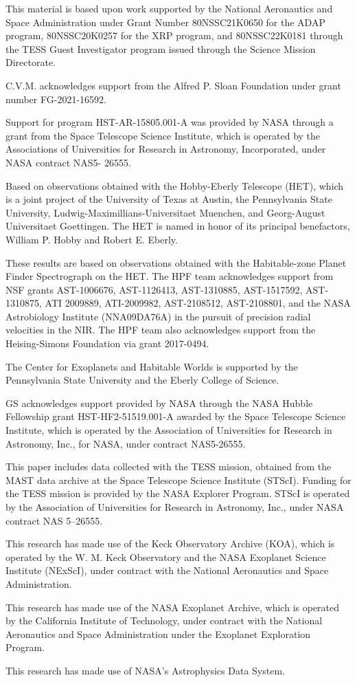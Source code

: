 \documentclass[linenumbers, twocolumn, trackchanges]{aastex631}
\begin{document}
\begin{acknowledgements}

  This material is based upon work supported by the National Aeronautics and Space Administration under Grant Number 80NSSC21K0650 for the ADAP program, 80NSSC20K0257 for the XRP program, and 80NSSC22K0181 through the TESS Guest Investigator program issued through the Science Mission Directorate.

  C.V.M. acknowledges support from the Alfred P. Sloan Foundation under grant number FG-2021-16592.

  Support for program HST-AR-15805.001-A was provided by NASA through a grant from the Space Telescope Science Institute, which is operated by the Associations of Universities for Research in Astronomy, Incorporated, under NASA contract NAS5- 26555.

  Based on observations obtained with the Hobby-Eberly Telescope (HET), which is a joint project of the University of Texas at Austin, the Pennsylvania State University, Ludwig-Maximillians-Universitaet Muenchen, and Georg-August Universitaet Goettingen. The HET is named in honor of its principal benefactors, William P. Hobby and Robert E. Eberly.

  These results are based on observations obtained with the Habitable-zone Planet Finder Spectrograph on the HET. The HPF team acknowledges support from NSF grants AST-1006676, AST-1126413, AST-1310885, AST-1517592, AST-1310875, ATI 2009889, ATI-2009982, AST-2108512, AST-2108801, and the NASA Astrobiology Institute (NNA09DA76A) in the pursuit of precision radial velocities in the NIR. The HPF team also acknowledges support from the Heising-Simons Foundation via grant 2017-0494.

  The Center for Exoplanets and Habitable Worlds is supported by the Pennsylvania State University and the Eberly College of Science.

  GS acknowledges support provided by NASA through the NASA Hubble Fellowship grant HST-HF2-51519.001-A awarded by the Space Telescope Science Institute, which is operated by the Association of Universities for Research in Astronomy, Inc., for NASA, under contract NAS5-26555.

  This paper includes data collected with the TESS mission, obtained from the MAST data archive at the Space Telescope Science Institute (STScI). Funding for the TESS mission is provided by the NASA Explorer Program. STScI is operated by the Association of Universities for Research in Astronomy, Inc., under NASA contract NAS 5–26555.

  This research has made use of the Keck Observatory Archive (KOA), which is operated by the W. M. Keck Observatory and the NASA Exoplanet Science Institute (NExScI), under contract with the National Aeronautics and Space Administration.

  This research has made use of the NASA Exoplanet Archive, which is operated by the California Institute of Technology, under contract with the National Aeronautics and Space Administration under the Exoplanet Exploration Program.

  This research has made use of NASA's Astrophysics Data System.
\end{acknowledgements}
\end{document}
